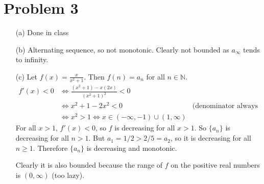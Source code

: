 \documentclass[preview, margin=0.6in]{standalone}
\newcommand*{\problem}[1]{\section*{Problem #1}}
\begin{document}
\problem{3}
\begin{itemize}
	\item[(a)] Done in class
	\item[(b)] Alternating sequence, so not monotonic. Clearly not bounded as $a_{\infty}$ tends to infinity.
	\item[(c)] Let $\displaystyle f(x)=\frac{x}{x^2+1}$. Then $f(n)=a_n$ for all $n\in\mathbb N$.
	\begin{align*}
	    f'(x)<0
		&\iff \frac{\left(x^2+1\right)-x(2x)}{\left(x^2+1\right)^2}<0 \\
		&\iff x^2+1-2x^2<0 & \text{(denominator always positive)} \\
		&\iff x^2>1 \iff x\in (-\infty,-1)\cup (1,\infty)
	\end{align*}
	For all $x>1$, $f'(x)<0$, so $f$ is decreasing for all $x>1$. So $\{a_n\}$ is decreasing for all $n>1$. But $a_1=1/2>2/5=a_2$, so it is decreasing for all $n\geq1$. Therefore $\{a_n\}$ is decreasing and monotonic.

	Clearly it is also bounded because the range of $f$ on the positive real numbers is $(0,\infty)$ (too lazy).
\end{itemize}
\end{document}
